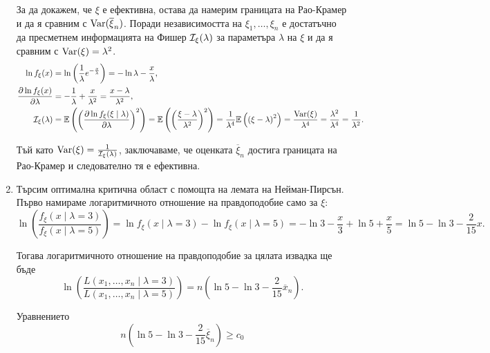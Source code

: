 \documentclass[numbers=endperiod, DIV=15, bibliography=totocnumbered]{scrartcl}
\begin{document}
\begin{solution}
\begin{enumerate}[label=\alph*)]
    За да докажем, че $\xi$ е ефективна, остава да намерим границата на Рао-Крамер и да я сравним с $\operatorname{Var}(\overline \xi_n)$. Поради независимостта на $\xi_1, \ldots, \xi_n$ е достатъчно да пресметнем информацията на Фишер $\mathcal{I}_\xi(\lambda)$ за параметъра $\lambda$ на $\xi$ и да я сравним с $\operatorname{Var}(\xi) = \lambda^2$.
    \begin{align*}
      \ln f_\xi(x)
      &=
      \ln \left(\frac 1 \lambda e^{-\frac x \lambda} \right)
      =
      -\ln \lambda -\frac x \lambda,
      \\
      \frac {\partial \ln f_\xi(x)} {\partial \lambda}
      &=
      -\frac 1 \lambda + \frac x {\lambda^2}
      =
      \frac {x - \lambda} {\lambda^2},
      \\
      \mathcal{I}_\xi(\lambda)
      &=
      \mathbb{E} \left( {\left( \frac {\partial \ln f_\xi(\xi \mid \lambda)} {\partial \lambda} \right)}^2 \right)
      =
      \mathbb{E} \left( {\left( \frac {\xi - \lambda} {\lambda^2} \right)}^2 \right)
      =
      \frac 1 {\lambda^4} \mathbb{E} \left( {({\xi - \lambda})}^2 \right)
      =
      \frac {\operatorname{Var}(\xi)} {\lambda^4}
      =
      \frac {\lambda^2} {\lambda^4}
      =
      \frac 1 {\lambda^2}.
    \end{align*}

    Тъй като $\operatorname{Var}(\xi) = \frac 1 {\mathcal{I}_\xi(\lambda)}$, заключаваме, че оценката $\overline \xi_n$ достига границата на Рао-Крамер и следователно тя е ефективна.

    \item Търсим оптимална критична област с помощта на лемата на Нейман-Пирсън. Първо намираме логаритмичното отношение на правдоподобие само за $\xi$:
    \begin{displaymath}
      \ln \left(\frac {f_\xi(x \mid \lambda=3)} {f_\xi(x \mid \lambda=5)} \right)
      =
      \ln f_\xi(x \mid \lambda=3) - \ln f_\xi(x \mid \lambda=5)
      =
      - \ln 3 - \frac x 3 + \ln 5 + \frac x 5
      =
      \ln 5 - \ln 3 - \frac 2 {15} x.
    \end{displaymath}

    Тогава логаритмичното отношение на правдоподобие за цялата извадка ще бъде
    \begin{displaymath}
      \ln \left(\frac {L(x_1, \ldots, x_n \mid \lambda=3)} {L(x_1, \ldots, x_n \mid \lambda=5)} \right)
      =
      n \left(\ln 5 - \ln 3 - \frac 2 {15} \overline x_n \right).
    \end{displaymath}

    Уравнението
    \begin{displaymath}
      n \left(\ln 5 - \ln 3 - \frac 2 {15} \overline \xi_n \right) \geq c_0
    \end{displaymath}


\end{enumerate}
\end{solution}
\end{document}
